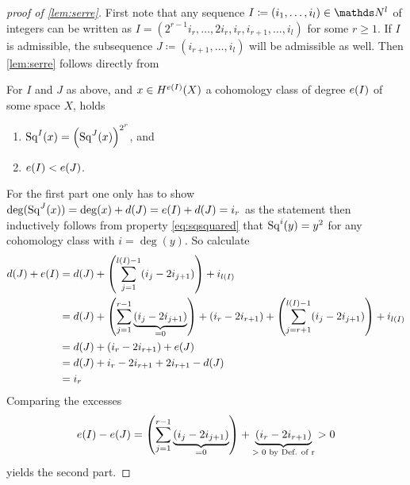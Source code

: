 \begin{proof}[proof of \autoref{lem:serre}]
  First note that any sequence $I\coloneqq(i_1,\dotsc,i_l)\in\Nat^l$
  of integers can be written as
  $I=(2^{r-1}i_r,\dotsc,2i_r,i_r,i_{r+1},\dotsc,i_l)$
  for some $r\geq 1$. If $I$ is admissible, the subsequence
  $J\coloneqq(i_{r+1},\dotsc,i_l)$ will be admissible as well.
  Then \autoref{lem:serre} follows directly from
  \begin{claim}
    For $I$ and $J$ as above, and $x\in H^{e(I)}(X)$ a cohomology
    class of degree $e(I)$ of some space $X$, holds
    \begin{enumerate}
    \item $\mathrm{Sq}^{I}(x) = \left(\mathrm{Sq}^{J}(x)\right)^{2^r}$, and
    \item $e(I)<e(J)$.
    \end{enumerate}
  \end{claim}
  For the first part one only has to show
  $\deg(\mathrm{Sq}^{J}(x))=\deg(x)+d(J)=e(I)+d(J)=i_r$
  as the statement then inductively follows from property
  \eqref{eq:sqsquared} that $\mathrm{Sq}^{i}(y)=y^2$ for any cohomology class
  with $i=\deg(y)$.
  So calculate
  \begin{align*}
    d(J) + e(I)
    &= d(J) 
      + \left(\sum_{j=1}^{l(I)-1}(i_j-2i_{j+1})\right)
      + i_{l(I)}\\
    &= d(J)
      + \left(\sum_{j=1}^{r-1}\underbrace{(i_j-2i_{j+1})}_{=0}\right)
      + (i_r-2i_{r+1})
      +\left(\sum_{j=r+1}^{l(I)-1}(i_j-2i_{j+1})\right) + i_{l(I)}\\
    &= d(J)
      + (i_r-2i_{r+1})
      + e(J) \\
    &= d(J) + i_r - 2i_{r+1} + 2i_{r+1} - d(J) \\
    &= i_r
  \end{align*}
  Comparing the excesses
  \begin{gather*}
    e(I) - e(J)
    = \left(\sum_{j=1}^{r-1}\underbrace{(i_j-2i_{j+1})}_{=0}\right)
    + \underbrace{(i_r - 2i_{r+1})}_{\text{$>0$ by Def. of r}}
    > 0
  \end{gather*}
  yields the second part.
\end{proof}



